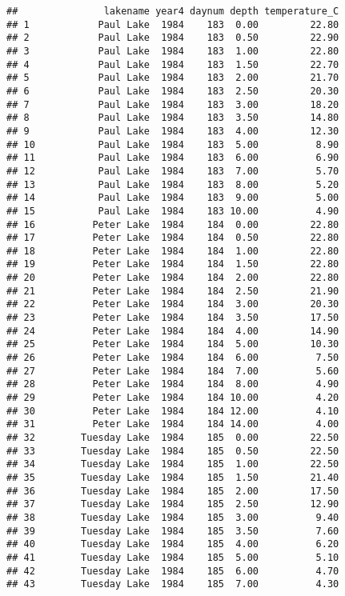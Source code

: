 \documentclass[
]{article}
\begin{document}
\begin{verbatim}
##               lakename year4 daynum depth temperature_C
## 1            Paul Lake  1984    183  0.00         22.80
## 2            Paul Lake  1984    183  0.50         22.90
## 3            Paul Lake  1984    183  1.00         22.80
## 4            Paul Lake  1984    183  1.50         22.70
## 5            Paul Lake  1984    183  2.00         21.70
## 6            Paul Lake  1984    183  2.50         20.30
## 7            Paul Lake  1984    183  3.00         18.20
## 8            Paul Lake  1984    183  3.50         14.80
## 9            Paul Lake  1984    183  4.00         12.30
## 10           Paul Lake  1984    183  5.00          8.90
## 11           Paul Lake  1984    183  6.00          6.90
## 12           Paul Lake  1984    183  7.00          5.70
## 13           Paul Lake  1984    183  8.00          5.20
## 14           Paul Lake  1984    183  9.00          5.00
## 15           Paul Lake  1984    183 10.00          4.90
## 16          Peter Lake  1984    184  0.00         22.80
## 17          Peter Lake  1984    184  0.50         22.80
## 18          Peter Lake  1984    184  1.00         22.80
## 19          Peter Lake  1984    184  1.50         22.80
## 20          Peter Lake  1984    184  2.00         22.80
## 21          Peter Lake  1984    184  2.50         21.90
## 22          Peter Lake  1984    184  3.00         20.30
## 23          Peter Lake  1984    184  3.50         17.50
## 24          Peter Lake  1984    184  4.00         14.90
## 25          Peter Lake  1984    184  5.00         10.30
## 26          Peter Lake  1984    184  6.00          7.50
## 27          Peter Lake  1984    184  7.00          5.60
## 28          Peter Lake  1984    184  8.00          4.90
## 29          Peter Lake  1984    184 10.00          4.20
## 30          Peter Lake  1984    184 12.00          4.10
## 31          Peter Lake  1984    184 14.00          4.00
## 32        Tuesday Lake  1984    185  0.00         22.50
## 33        Tuesday Lake  1984    185  0.50         22.50
## 34        Tuesday Lake  1984    185  1.00         22.50
## 35        Tuesday Lake  1984    185  1.50         21.40
## 36        Tuesday Lake  1984    185  2.00         17.50
## 37        Tuesday Lake  1984    185  2.50         12.90
## 38        Tuesday Lake  1984    185  3.00          9.40
## 39        Tuesday Lake  1984    185  3.50          7.60
## 40        Tuesday Lake  1984    185  4.00          6.20
## 41        Tuesday Lake  1984    185  5.00          5.10
## 42        Tuesday Lake  1984    185  6.00          4.70
## 43        Tuesday Lake  1984    185  7.00          4.30

\end{verbatim}
\end{document}
